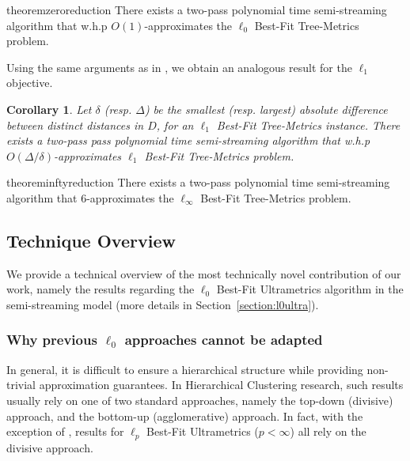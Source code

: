 \documentclass{article}
\newtheorem{corollary}[theorem]{Corollary}
\begin{document}
\begin{restatable}{theorem}{zeroreduction}\label{theorem:best_tree_zero}
There exists a two-pass polynomial time semi-streaming algorithm that w.h.p $O(1)$-approximates the $\ell_0$ Best-Fit Tree-Metrics problem.
\end{restatable}

Using the same arguments as in , we obtain an analogous result for the $\ell_1$ objective.

\begin{corollary} Let $\delta$ (resp. $\Delta$) be the smallest (resp. largest) absolute difference between distinct distances in $D$, for an $\ell_1$ Best-Fit Tree-Metrics instance. There exists a two-pass pass polynomial time semi-streaming algorithm that w.h.p $O(\Delta/\delta)$-approximates $\ell_1$ Best-Fit Tree-Metrics problem.
\end{corollary}

\begin{restatable}{theorem}{inftyreduction}\label{theorem:best_tree_infty}
There exists a two-pass polynomial time semi-streaming algorithm that 6-approximates the $\ell_\infty$ Best-Fit Tree-Metrics problem.
\end{restatable}
 

\subsection{Technique Overview}
We provide a technical overview of the most technically novel contribution of our work, namely the results regarding the $\ell_0$ Best-Fit Ultrametrics algorithm in the semi-streaming model (more details in Section~\ref{section:l0ultra}).

\subsubsection{\texorpdfstring{Why previous $\ell_0$ approaches cannot be adapted}{Why previous l-0 approaches cannot be adapted}} \label{sec:othersDontWork}
In general, it is difficult to ensure a hierarchical structure while providing non-trivial approximation guarantees.
In Hierarchical Clustering research, such results usually rely on one of two standard approaches, namely the top-down (divisive) approach, and the bottom-up (agglomerative) approach.
In fact, with the exception of \cite{debarati}, results for $\ell_p$ Best-Fit Ultrametrics ($p<\infty$) \cite{mcgregor, charikar, debarati, cohen2022fitting, CharikarG24} all rely on the divisive approach.
\end{document}
